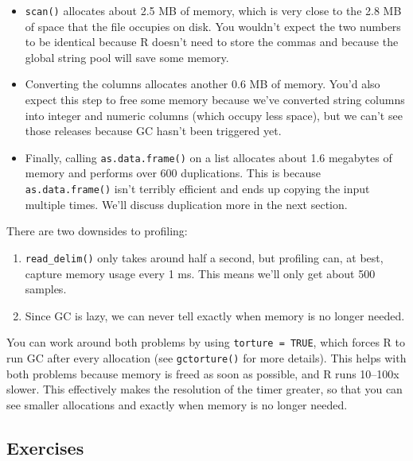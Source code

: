 \begin{itemize}
\item
  \texttt{scan()} allocates about 2.5 MB of memory, which is very close
  to the 2.8 MB of space that the file occupies on disk. You wouldn't
  expect the two numbers to be identical because R doesn't need to store
  the commas and because the global string pool will save some memory.
\item
  Converting the columns allocates another 0.6 MB of memory. You'd also
  expect this step to free some memory because we've converted string
  columns into integer and numeric columns (which occupy less space),
  but we can't see those releases because GC hasn't been triggered yet.
\item
  Finally, calling \texttt{as.data.frame()} on a list allocates about
  1.6 megabytes of memory and performs over 600 duplications. This is
  because \texttt{as.data.frame()} isn't terribly efficient and ends up
  copying the input multiple times. We'll discuss duplication more in
  the next section.
\end{itemize}

There are two downsides to profiling:

\begin{enumerate}
\def\labelenumi{\arabic{enumi}.}
\item
  \texttt{read\_delim()} only takes around half a second, but profiling
  can, at best, capture memory usage every 1 ms. This means we'll only
  get about 500 samples.
\item
  Since GC is lazy, we can never tell exactly when memory is no longer
  needed.
\end{enumerate}

You can work around both problems by using \texttt{torture\ =\ TRUE},
which forces R to run GC after every allocation (see
\texttt{gctorture()} for more details). This helps with both problems
because memory is freed as soon as possible, and R runs 10--100x slower.
This effectively makes the resolution of the timer greater, so that you
can see smaller allocations and exactly when memory is no longer needed.

\hypertarget{exercises-1}{%
\subsection{Exercises}\label{exercises-1}}

